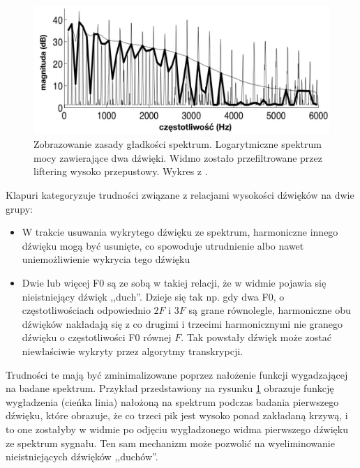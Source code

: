 \documentclass[12pt,a4paper,twoside]{mwart}
\begin{document}
\begin{figure}[ht]
  \begin{center}
    \includegraphics[scale=0.38]{images/spectral_smoothnes_kapuri.jpg}
    \caption{Zobrazowanie zasady gładkości spektrum. Logarytmiczne spektrum mocy zawierające dwa dźwięki. Widmo zostało przefiltrowane przez liftering wysoko przepustowy. Wykres z \cite[3383]{Transcription:Klapuri:MultipitchEstimationAndSeparation}.}
    \label{fig:specSmooth:kapuri}
  \end{center}
\end{figure}

Klapuri kategoryzuje trudności związane z relacjami wysokości dźwięków na dwie grupy:
\begin{itemize}
\item W trakcie usuwania wykrytego dźwięku ze spektrum, harmoniczne innego dźwięku mogą być usunięte, co spowoduje utrudnienie albo nawet uniemożliwienie wykrycia tego dźwięku
\item Dwie lub więcej F0 są ze sobą w takiej relacji, że w widmie pojawia się nieistniejący dźwięk ,,duch''. Dzieje się tak np. gdy dwa F0, o częstotliwościach odpowiednio $2F$ i $3F$ są grane równolegle, harmoniczne obu dźwięków nakładają się z co drugimi i trzecimi harmonicznymi nie granego dźwięku o częstotliwości F0 równej $F$. Tak powstały dźwięk może zostać niewłaściwie wykryty przez algorytmy transkrypcji.
\end{itemize}
Trudności te mają być zminimalizowane poprzez nałożenie funkcji wygadzającej na badane spektrum. Przykład przedstawiony na rysunku \ref{fig:specSmooth:kapuri} obrazuje funkcję wygładzenia (cieńka linia) nałożoną na spektrum podczas badania pierwszego dźwięku, które obrazuje, że co trzeci pik jest wysoko ponad zakładaną krzywą, i to one zostałyby w widmie po odjęciu wygładzonego widma pierwszego dźwięku ze spektrum sygnału. Ten sam mechanizm może pozwolić na wyeliminowanie nieistniejących dźwięków ,,duchów''.
\end{document}
